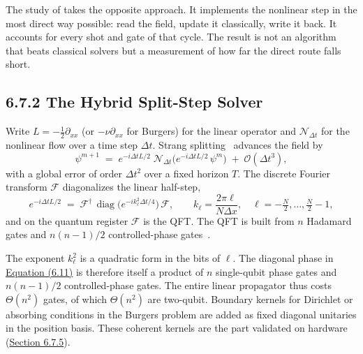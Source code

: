 \documentclass{report}
\theoremstyle{plain}
\theoremstyle{definition}
\theoremstyle{remark}
\newcommand{\bigO}[1]{\mathcal{O}\!\left(#1\right)}
\begin{document}
The study of \cite{guo2026nonlinearwaves} takes the opposite approach. It implements the nonlinear step in the most direct way possible: read the field, update it classically, write it back. It accounts for every shot and gate of that cycle. The result is not an algorithm that beats classical solvers but a measurement of how far the direct route falls short.

\subsection{6.7.2 The Hybrid Split-Step Solver}\label{sec:syn:splitstep}

Write $L=-\tfrac12\partial_{xx}$ (or $-\nu\partial_{xx}$ for Burgers) for the linear operator and $\mathcal{N}_{\Delta t}$ for the nonlinear flow over a time step $\Delta t$. Strang splitting~\cite{strang1968splitting} advances the field by
\hypertarget{eq:syn:strang}{}\[
  \psi^{m+1} \;=\; e^{-i\Delta t L/2}\;\mathcal{N}_{\Delta t}\!\big(e^{-i\Delta t L/2}\,\psi^{m}\big) \;+\;\bigO{\Delta t^{3}},
\tag{6.10}\]
with a global error of order $\Delta t^{2}$ over a fixed horizon $T$. The discrete Fourier transform $\mathcal{F}$ diagonalizes the linear half-step,
\hypertarget{eq:syn:linear}{}\[
  e^{-i\Delta t L/2} \;=\; \mathcal{F}^{\dagger}\,\operatorname{diag}\!\big(e^{-i k_\ell^{2}\Delta t/4}\big)\,\mathcal{F},
  \qquad k_\ell=\frac{2\pi\ell}{N\Delta x},\quad \ell=-\tfrac{N}{2},\dots,\tfrac{N}{2}-1,
\tag{6.11}\]
and on the quantum register $\mathcal{F}$ is the QFT. The QFT is built from $n$ Hadamard gates and $n(n-1)/2$ controlled-phase gates~\cite{nielsen2010qcqi}.

The exponent $k_\ell^{2}$ is a quadratic form in the bits of $\ell$. The diagonal phase in \hyperref[eq:syn:linear]{Equation (6.11)} is therefore itself a product of $n$ single-qubit phase gates and $n(n-1)/2$ controlled-phase gates. The entire linear propagator thus costs $\Theta(n^{2})$ gates, of which $\Theta(n^{2})$ are two-qubit. Boundary kernels for Dirichlet or absorbing conditions in the Burgers problem are added as fixed diagonal unitaries in the position basis. These coherent kernels are the part validated on hardware (\hyperref[sec:syn:waves-results]{Section 6.7.5}).
\end{document}
